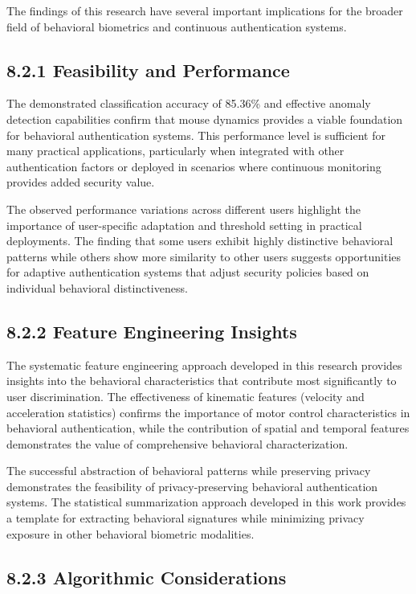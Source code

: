 \documentclass[
  12pt,
  a4paper,
]{report}
\begin{document}
The findings of this research have several important implications for
the broader field of behavioral biometrics and continuous authentication
systems.

\subsection{8.2.1 Feasibility and
Performance}\label{feasibility-and-performance}

The demonstrated classification accuracy of 85.36\% and effective
anomaly detection capabilities confirm that mouse dynamics provides a
viable foundation for behavioral authentication systems. This
performance level is sufficient for many practical applications,
particularly when integrated with other authentication factors or
deployed in scenarios where continuous monitoring provides added
security value.

The observed performance variations across different users highlight the
importance of user-specific adaptation and threshold setting in
practical deployments. The finding that some users exhibit highly
distinctive behavioral patterns while others show more similarity to
other users suggests opportunities for adaptive authentication systems
that adjust security policies based on individual behavioral
distinctiveness.

\subsection{8.2.2 Feature Engineering
Insights}\label{feature-engineering-insights}

The systematic feature engineering approach developed in this research
provides insights into the behavioral characteristics that contribute
most significantly to user discrimination. The effectiveness of
kinematic features (velocity and acceleration statistics) confirms the
importance of motor control characteristics in behavioral
authentication, while the contribution of spatial and temporal features
demonstrates the value of comprehensive behavioral characterization.

The successful abstraction of behavioral patterns while preserving
privacy demonstrates the feasibility of privacy-preserving behavioral
authentication systems. The statistical summarization approach developed
in this work provides a template for extracting behavioral signatures
while minimizing privacy exposure in other behavioral biometric
modalities.

\subsection{8.2.3 Algorithmic
Considerations}\label{algorithmic-considerations}
\end{document}
